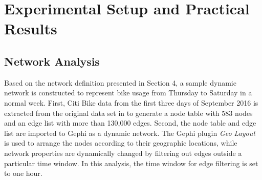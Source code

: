\documentclass[times, 10pt,twocolumn]{article}
\begin{document}
%
%
%
%

\section{Experimental Setup and Practical Results}

\subsection{Network Analysis}
Based on the network definition presented in Section 4, a sample dynamic network is constructed to represent bike usage from Thursday to Saturday in a normal week. First, Citi Bike data from the first three days of September 2016 is extracted from the original data set in \cite{dataset} to generate a node table with 583 nodes and an edge list with more than 130,000 edges. Second, the node table and edge list are imported to Gephi as a dynamic network. The Gephi plugin \textit{Geo Layout} is used to arrange the nodes according to their geographic locations, while network properties are dynamically changed by filtering out edges outside a particular time window. In this analysis, the time window for edge filtering is set to one hour.\\
\end{document}
